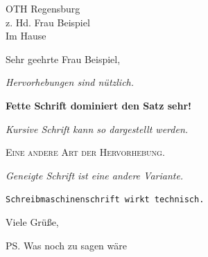 \documentclass[paper=a4,fontsize=12pt,parskip=half,department=FakEI,logostyle=flat]{scrlttr2}
\begin{document}
\begin{letter}{OTH Regensburg\\
z. Hd. Frau Beispiel\\[1ex]
Im Hause
}

\opening{Sehr geehrte Frau Beispiel,}

\lipsum[2]

\emph{Hervorhebungen sind nützlich.}

\textbf{Fette Schrift dominiert den Satz sehr!}

\textit{Kursive Schrift kann so dargestellt werden.}

\textsc{Eine andere Art der Hervorhebung.}

\textsl{Geneigte Schrift ist eine andere Variante.}

\texttt{Schreibmaschinenschrift wirkt technisch.}

\textcolor{Accent}{\lipsum[2]}

\lipsum

\closing{Viele Grüße,}

\ps{Was noch zu sagen wäre}

\end{letter}
\end{document}
